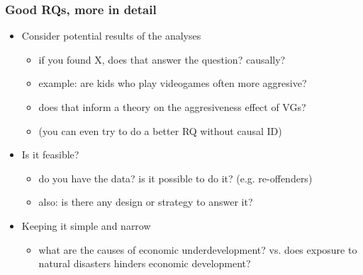 \begin{frame}
\frametitle{Good RQs, more in detail}
\centering

\begin{itemize}
  \item[1.] Consider potential results of the analyses
  \begin{itemize}
    \item if you found X, does that answer the question? causally?
    \item example: are kids who play videogames often more aggresive?
    \item does that inform a theory on the aggresiveness effect of VGs?
    \item[] (you can even try to do a better RQ without causal ID)
  \end{itemize}
  \item<2->[2.] Is it feasible?
  \begin{itemize}
    \item do you have the data? is it possible to do it? (e.g. re-offenders)
    \item also: is there any design or strategy to answer it?
  \end{itemize}
  \item<3->[3.] Keeping it simple and narrow
  \begin{itemize}
    \item what are the causes of economic underdevelopment? vs. does exposure to natural disasters hinders economic development?
  \end{itemize}
\end{itemize}

\end{frame}


